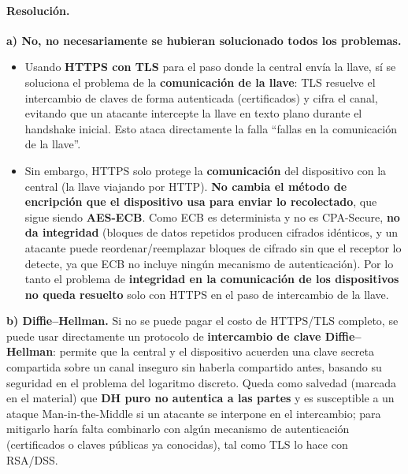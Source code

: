 \paragraph{Resolución.}

\textbf{a) No, no necesariamente se hubieran solucionado todos los problemas.}
\begin{itemize}
  \item Usando \textbf{HTTPS con TLS} para el paso donde la central envía la llave, sí se
  soluciona el problema de la \textbf{comunicación de la llave}: TLS resuelve el intercambio
  de claves de forma autenticada (certificados) y cifra el canal, evitando que un atacante
  intercepte la llave en texto plano durante el handshake inicial. Esto ataca directamente la
  falla ``fallas en la comunicación de la llave''.
  \item Sin embargo, HTTPS solo protege la \textbf{comunicación} del dispositivo con la
  central (la llave viajando por HTTP). \textbf{No cambia el método de encripción que el
  dispositivo usa para enviar lo recolectado}, que sigue siendo \textbf{AES-ECB}. Como ECB es
  determinista y no es CPA-Secure, \textbf{no da integridad} (bloques de datos repetidos
  producen cifrados idénticos, y un atacante puede reordenar/reemplazar bloques de cifrado
  sin que el receptor lo detecte, ya que ECB no incluye ningún mecanismo de autenticación).
  Por lo tanto el problema de \textbf{integridad en la comunicación de los dispositivos}
  \textbf{no queda resuelto} solo con HTTPS en el paso de intercambio de la llave.
\end{itemize}

\textbf{b) Diffie--Hellman.} Si no se puede pagar el costo de HTTPS/TLS completo, se puede
usar directamente un protocolo de \textbf{intercambio de clave Diffie--Hellman}: permite que
la central y el dispositivo acuerden una clave secreta compartida sobre un canal inseguro sin
haberla compartido antes, basando su seguridad en el problema del logaritmo discreto. Queda
como salvedad (marcada en el material) que \textbf{DH puro no autentica a las partes} y es
susceptible a un ataque Man-in-the-Middle si un atacante se interpone en el intercambio; para
mitigarlo haría falta combinarlo con algún mecanismo de autenticación (certificados o claves
públicas ya conocidas), tal como TLS lo hace con RSA/DSS.

